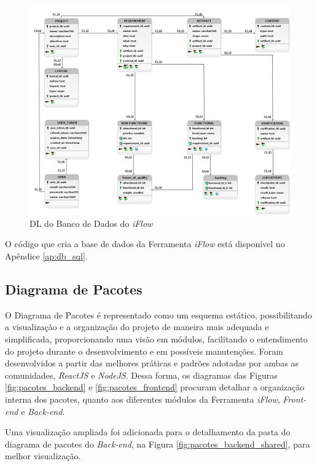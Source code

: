\begin{figure}[]
    \begin{center}
        \caption{{DL do Banco de Dados do \textit{iFlow}}}
        \label{fig:diagrama_logico}
        \includegraphics[scale=0.37]{figuras/Proposta/Logico_iFlow.png}
    \end{center}
\end{figure}

O código que cria a base de dados da Ferramenta \textit{iFlow} está disponível no Apêndice \ref{ap:db_sql}.

\subsection{Diagrama de Pacotes}

O Diagrama de Pacotes é representado como um esquema estático, possibilitando a visualização e a organização do projeto de maneira mais adequada e simplificada, proporcionando uma visão em módulos, facilitando o entendimento do projeto durante o desenvolvimento e em possíveis manutenções. Foram desenvolvidos a partir das melhores práticas e padrões adotadas por ambas as comunidades, \textit{ReactJS} e \textit{NodeJS}. Dessa forma, os diagramas das Figuras \ref{fig:pacotes_backend} e \ref{fig:pacotes_frontend} procuram detalhar a organização interna dos pacotes, quanto aos diferentes módulos da Ferramenta \textit{iFlow}, \textit{Front-end} e \textit{Back-end}.

Uma visualização ampliada foi adicionada para o detalhamento da pasta do diagrama de pacotes do \textit{Back-end}, na Figura \ref{fig:pacotes_backend_shared}, para melhor visualização.

